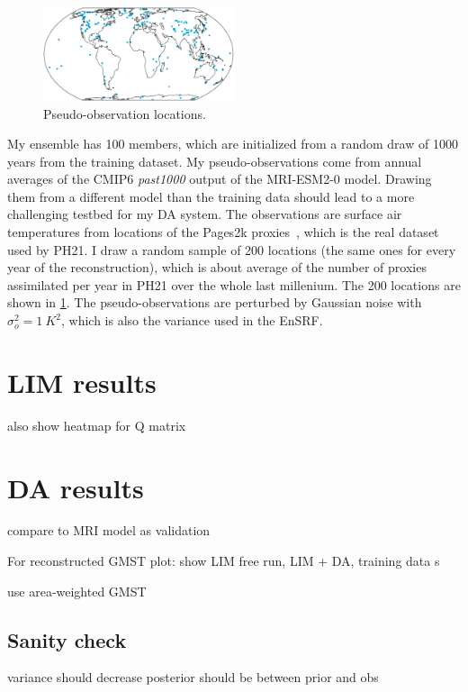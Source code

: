 \documentclass[parskip=half,DIV=16]{scrartcl}
\begin{document}
\begin{figure}[h]
    \centering
    \includegraphics[width=0.5\textwidth]{figures/plots/obs_locations.pdf}
    \caption{Pseudo-observation locations.}
    \label{fig:obs-locs}
\end{figure}

My ensemble has 100 members, which are initialized from a random draw of 1000 years from the training dataset. My pseudo-observations come from annual averages of the CMIP6 \emph{past1000} output of the MRI-ESM2-0 model. Drawing them from a different model than the training data should lead to a more challenging testbed for my \gls{DA} system. The observations are surface air temperatures from locations of the Pages2k proxies~\parencite{PAGESConsortium2017}, which is the real dataset used by PH21. I draw a random sample of 200 locations (the same ones for every year of the reconstruction), which is about average of the number of proxies assimilated per year in PH21 over the whole last millenium. The 200 locations are shown in \cref{fig:obs-locs}. The pseudo-observations are perturbed by Gaussian noise with $\sigma_o^2 = \qty{1}{K^2}$, which is also the variance used in the \gls{EnSRF}.




\section{LIM results}


also show heatmap for Q matrix



\section{DA results}

compare to MRI model as validation

For reconstructed GMST plot: show LIM free run, LIM + DA, training data
s

use area-weighted GMST



\subsection{Sanity check}
variance should decrease
posterior should be between prior and obs


\printbibliography
\end{document}
